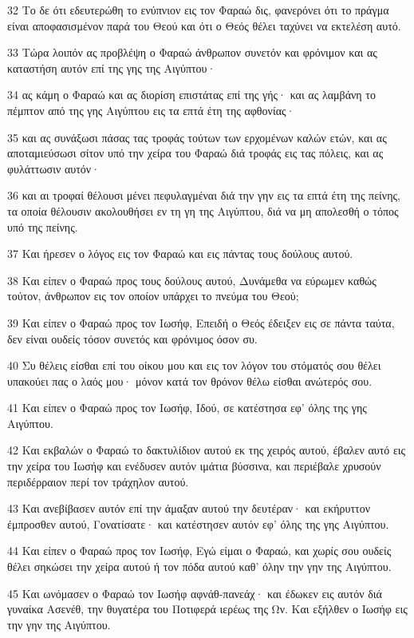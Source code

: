 \par 32 Το δε ότι εδευτερώθη το ενύπνιον εις τον Φαραώ δις, φανερόνει ότι το πράγμα είναι αποφασισμένον παρά του Θεού και ότι ο Θεός θέλει ταχύνει να εκτελέση αυτό.
\par 33 Τώρα λοιπόν ας προβλέψη ο Φαραώ άνθρωπον συνετόν και φρόνιμον και ας καταστήση αυτόν επί της γης της Αιγύπτου·
\par 34 ας κάμη ο Φαραώ και ας διορίση επιστάτας επί της γής· και ας λαμβάνη το πέμπτον από της γης Αιγύπτου εις τα επτά έτη της αφθονίας·
\par 35 και ας συνάξωσι πάσας τας τροφάς τούτων των ερχομένων καλών ετών, και ας αποταμιεύσωσι σίτον υπό την χείρα του Φαραώ διά τροφάς εις τας πόλεις, και ας φυλάττωσιν αυτόν·
\par 36 και αι τροφαί θέλουσι μένει πεφυλαγμέναι διά την γην εις τα επτά έτη της πείνης, τα οποία θέλουσιν ακολουθήσει εν τη γη της Αιγύπτου, διά να μη απολεσθή ο τόπος υπό της πείνης.
\par 37 Και ήρεσεν ο λόγος εις τον Φαραώ και εις πάντας τους δούλους αυτού.
\par 38 Και είπεν ο Φαραώ προς τους δούλους αυτού, Δυνάμεθα να εύρωμεν καθώς τούτον, άνθρωπον εις τον οποίον υπάρχει το πνεύμα του Θεού;
\par 39 Και είπεν ο Φαραώ προς τον Ιωσήφ, Επειδή ο Θεός έδειξεν εις σε πάντα ταύτα, δεν είναι ουδείς τόσον συνετός και φρόνιμος όσον συ.
\par 40 Συ θέλεις είσθαι επί του οίκου μου και εις τον λόγον του στόματός σου θέλει υπακούει πας ο λαός μου· μόνον κατά τον θρόνον θέλω είσθαι ανώτερός σου.
\par 41 Και είπεν ο Φαραώ προς τον Ιωσήφ, Ιδού, σε κατέστησα εφ' όλης της γης Αιγύπτου.
\par 42 Και εκβαλών ο Φαραώ το δακτυλίδιον αυτού εκ της χειρός αυτού, έβαλεν αυτό εις την χείρα του Ιωσήφ και ενέδυσεν αυτόν ιμάτια βύσσινα, και περιέβαλε χρυσούν περιδέρραιον περί τον τράχηλον αυτού.
\par 43 Και ανεβίβασεν αυτόν επί την άμαξαν αυτού την δευτέραν· και εκήρυττον έμπροσθεν αυτού, Γονατίσατε· και κατέστησεν αυτόν εφ' όλης της γης Αιγύπτου.
\par 44 Και είπεν ο Φαραώ προς τον Ιωσήφ, Εγώ είμαι ο Φαραώ, και χωρίς σου ουδείς θέλει σηκώσει την χείρα αυτού ή τον πόδα αυτού καθ' όλην την γην της Αιγύπτου.
\par 45 Και ωνόμασεν ο Φαραώ τον Ιωσήφ αφνάθ-πανεάχ· και έδωκεν εις αυτόν διά γυναίκα Ασενέθ, την θυγατέρα του Ποτιφερά ιερέως της Ων. Και εξήλθεν ο Ιωσήφ εις την γην της Αιγύπτου.
